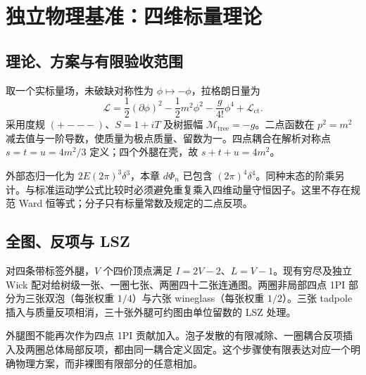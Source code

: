 \documentclass[11pt,a4paper,oneside]{ctexrep}
\theoremstyle{cnplain}
\theoremstyle{definition}
\theoremstyle{remark}
\begin{document}
\chapter{独立物理基准：四维标量理论}\label{ch:physics}
\section{理论、方案与有限验收范围}
取一个实标量场，未破缺对称性为 $\phi\mapsto-\phi$，拉格朗日量为
\begin{equation}
 \mathcal L=\frac12(\partial\phi)^2-\frac12m^2\phi^2
 -\frac{g}{4!}\phi^4+\mathcal L_{\mathrm{ct}}.
\end{equation}
采用度规 $(+---)$、$S=1+iT$ 及树振幅 $\mathcal M_{\mathrm{tree}}=-g$。二点函数在 $p^2=m^2$ 减去值与一阶导数，使质量为极点质量、留数为一。四点耦合在解析对称点 $s=t=u=4m^2/3$ 定义；四个外腿在壳，故 $s+t+u=4m^2$。

外部态归一化为 $2E(2\pi)^3\delta^3$，本章 $d\Phi_n$ 已包含 $(2\pi)^4\delta^4$。同种末态的阶乘另计。与标准运动学公式\cite{pdg}比较时必须避免重复乘入四维动量守恒因子。这里不存在规范 Ward 恒等式；分子只有标量常数及规定的二点反项。

\section{全图、反项与 LSZ}
对四条带标签外腿，$V$ 个四价顶点满足 $I=2V-2$、$L=V-1$。现有穷尽及独立 Wick 配对给树级一张、一圈七张、两圈四十二张连通图。两圈非局部四点 1PI 部分为三张双泡（每张权重 $1/4$）与六张 wineglass（每张权重 $1/2$）。三张 tadpole 插入与质量反项相消，三十张外腿可约图由单位留数的 LSZ 处理。

外腿图不能再次作为四点 1PI 贡献加入。泡子发散的有限减除、一圈耦合反项插入及两圈总体局部反项，都由同一耦合定义固定。这个步骤使有限表达对应一个明确物理方案，而非裸图有限部分的任意相加。
\end{document}
